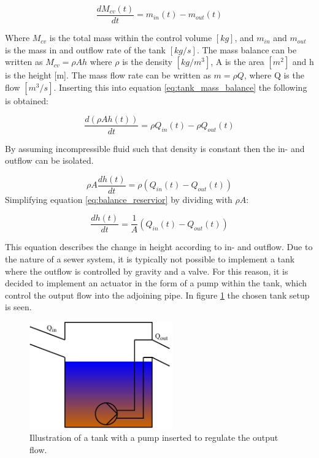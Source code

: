 \begin{equation}
         \frac{dM_{cv}(t)}{dt}=m_{in}(t)-m_{o ut}(t)
\label{eq:tank_mass_balance}
\end{equation} 

Where $M_{cv}$ is the total mass within the control volume $\left[kg\right]$, and $m_{in}$ and $m_{out}$ is the mass in and outflow rate of the tank $\left[kg/s\right]$. The mass balance can be written as $M_{cv} = \rho Ah$ where $\rho$ is the density $\left[kg/m^3 \right]$, A is the area $\left[m^2\right]$ and h is the height [m]. The mass flow rate can be written as $m = \rho Q$, where Q is the flow $\left[ m^3/s \right]$. Inserting this into equation \ref{eq:tank_mass_balance} the following is obtained:

\begin{equation}
        \frac{d(\rho Ah(t))}{dt}=\rho Q_{in}(t)-\rho Q_{out}(t)
\end{equation}

By assuming incompressible fluid such that density is constant then the in- and outflow can be isolated.

\begin{equation}\label{eq:balance_reservior}
    \rho A\frac{dh(t)}{dt}=\rho \left(Q_{in}(t)-Q_{out}(t)\right)
\end{equation}
Simplifying equation \ref{eq:balance_reservior} by dividing with $\rho A$:

\begin{equation}\label{eq:balance_reserviorv2}
    \frac{dh(t)}{dt}=\frac{1}{A} \left(Q_{in}(t)-Q_{out}(t)\right)
\end{equation}

This equation describes the change in height according to in- and outflow. Due to the nature of a sewer system, it is typically not possible to implement a tank where the outflow is controlled by gravity and a valve. For this reason, it is decided to implement an actuator in the form of a pump within the tank, which control the output flow into the adjoining pipe.
In figure \ref{fig:reservior_with_pump} the chosen tank setup is seen.

\begin{figure}[H]
    \centering
    \includegraphics[width=0.55\textwidth]{report/modeling/pictures/reservior_with_pump}
    \caption{Illustration of a tank with a pump inserted to regulate the output flow.}
    \label{fig:reservior_with_pump}
\end{figure}

